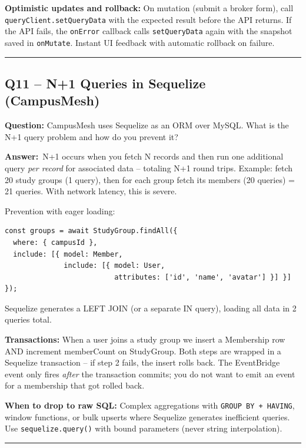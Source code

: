 \documentclass[letterpaper,10pt]{article}
\newlength{\boxwidth}
\newcommand{\questionbox}[1]{%
  \vspace{6pt}%
  \noindent\colorbox{qbg}{%
    \begin{minipage}{\boxwidth}%
      \vspace{3pt}\textbf{\textcolor{nordblue}{Question:}} #1\vspace{3pt}%
    \end{minipage}%
  }\vspace{2pt}%
}
\newcommand{\answerlabel}{\noindent\textbf{\textcolor{answerblue}{Answer:}}~}
\begin{document}
\textbf{Optimistic updates and rollback:} On mutation (submit a broker form), call \texttt{queryClient.setQueryData} with the expected result before the API returns. If the API fails, the \texttt{onError} callback calls \texttt{setQueryData} again with the snapshot saved in \texttt{onMutate}. Instant UI feedback with automatic rollback on failure.

\medskip\rule{\linewidth}{0.2pt}

\subsection*{Q11 -- N+1 Queries in Sequelize (CampusMesh)}

\questionbox{CampusMesh uses Sequelize as an ORM over MySQL. What is the N+1 query problem and how do you prevent it?}

\answerlabel N+1 occurs when you fetch N records and then run one additional query \textit{per record} for associated data -- totaling N+1 round trips. Example: fetch 20 study groups (1 query), then for each group fetch its members (20 queries) = 21 queries. With network latency, this is severe.

Prevention with eager loading:

\begin{lstlisting}
const groups = await StudyGroup.findAll({
  where: { campusId },
  include: [{ model: Member,
              include: [{ model: User,
                          attributes: ['id', 'name', 'avatar'] }] }]
});
\end{lstlisting}

Sequelize generates a LEFT JOIN (or a separate IN query), loading all data in 2 queries total.

\textbf{Transactions:} When a user joins a study group we insert a Membership row AND increment memberCount on StudyGroup. Both steps are wrapped in a Sequelize transaction -- if step 2 fails, the insert rolls back. The EventBridge event only fires \textit{after} the transaction commits; you do not want to emit an event for a membership that got rolled back.

\textbf{When to drop to raw SQL:} Complex aggregations with \texttt{GROUP BY + HAVING}, window functions, or bulk upserts where Sequelize generates inefficient queries. Use \texttt{sequelize.query()} with bound parameters (never string interpolation).

\medskip\rule{\linewidth}{0.2pt}

\end{document}
